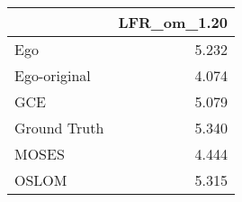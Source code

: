 \begin{tabular}{lr}
\toprule
{} & LFR_om_1.20 \\
\midrule
Ego          &       5.232 \\
Ego-original &       4.074 \\
GCE          &       5.079 \\
Ground Truth &       5.340 \\
MOSES        &       4.444 \\
OSLOM        &       5.315 \\
\bottomrule
\end{tabular}
